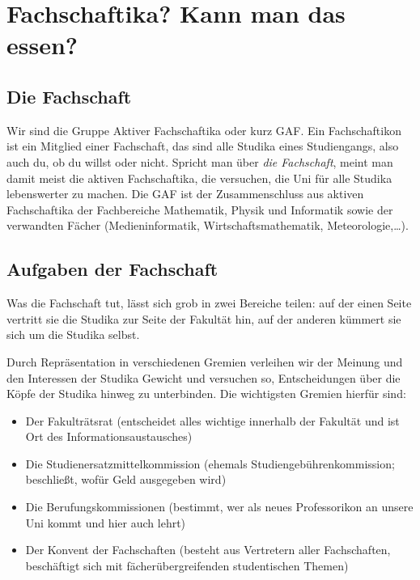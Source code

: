 \chapter{Fachschaftika? Kann man das essen?}

\section{Die Fachschaft}
Wir sind die Gruppe Aktiver Fachschaftika oder kurz GAF. Ein Fachschaftikon ist ein Mitglied einer Fachschaft, das sind alle Studika eines Studiengangs, also auch du, ob du willst oder nicht. Spricht man über \emph{die Fachschaft}, meint man damit meist die aktiven Fachschaftika, die versuchen, die Uni für alle Studika lebenswerter zu machen. Die GAF ist der Zusammenschluss aus aktiven Fachschaftika der Fachbereiche Mathematik, Physik und Informatik sowie der verwandten Fächer (Medieninformatik, Wirtschaftsmathematik, Meteorologie,\ldots).

\section{Aufgaben der Fachschaft}

Was die Fachschaft tut, lässt sich grob in zwei Bereiche teilen: auf der einen Seite vertritt sie die Studika zur Seite der Fakultät hin, auf der anderen kümmert sie sich um die Studika selbst.

Durch Repräsentation in verschiedenen Gremien verleihen wir der Meinung und den Interessen der Studika Gewicht und versuchen so, Entscheidungen über die Köpfe der Studika hinweg zu unterbinden. Die wichtigsten Gremien hierfür sind:
\begin{itemize}
\item Der Fakulträtsrat (entscheidet alles wichtige innerhalb der Fakultät und ist Ort des Informationsaustausches)
\item Die Studienersatzmittelkommission (ehemals Studiengebührenkommission; beschließt, wofür Geld ausgegeben wird)
\item Die Berufungskommissionen (bestimmt, wer als neues Professorikon an unsere Uni kommt und hier auch lehrt)
\item Der Konvent der Fachschaften (besteht aus Vertretern aller Fachschaften, beschäftigt sich mit fächerübergreifenden studentischen Themen)
\end{itemize}

